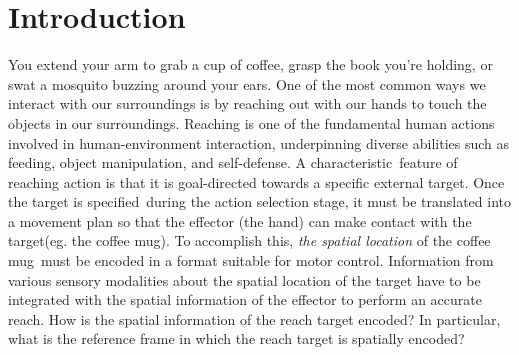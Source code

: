 \chapter{Introduction} 
\label{introduction} 


You extend your arm to grab a cup of coffee, grasp the book you're holding, or swat a mosquito buzzing around your ears. One of the most common ways we interact with our surroundings is by reaching out with our hands to touch the objects in our surroundings. Reaching is one of the fundamental human actions involved in human-environment interaction, underpinning diverse abilities such as feeding, object manipulation, and self-defense. A characteristic feature of reaching action is that it is goal-directed towards a specific external target. Once the target is specified during the action selection stage, it must be translated into a movement plan so that the effector (the hand) can make contact with the target(eg. the coffee mug). To accomplish this, \textit{the spatial location} of the coffee mug must be encoded in a format suitable for motor control. Information from various sensory modalities about the spatial location of the target have to be integrated with the spatial information of the effector to perform an accurate reach. How is the spatial information of the reach target encoded? In particular, what is the reference frame in which the reach target is spatially encoded? 


